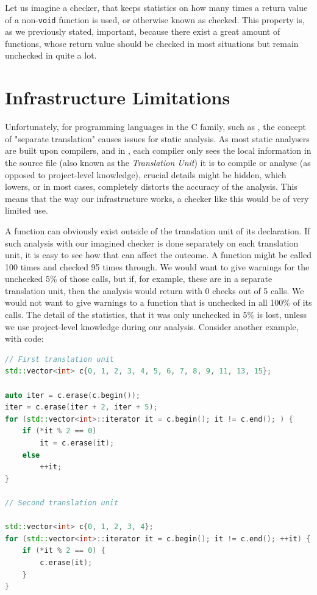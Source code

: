 Let us imagine a checker, that keeps statistics on how many times a return value of a non-\lstinline{void} function is used, or otherwise known
as checked. This property is, as we previously stated, important, because there exist a great amount of functions,
whose return value should be checked in most situations but remain unchecked in quite a lot.

\section{Infrastructure Limitations}

Unfortunately, for programming languages in the C family, such as \CC{}, the concept of "separate translation" causes issues for static
analysis. As most static analysers are built upon compilers, and in \CC{}, each compiler only sees the local information in the source file
(also known as the \emph{Translation Unit}) it is to compile or analyse (as opposed to project-level knowledge), crucial details
might be hidden, which lowers, or in most cases, completely distorts the accuracy of the analysis.
This means that the way our infrastructure works, a checker like this would be of very limited use.

A function can obviously exist outside of the translation unit of its declaration. If such analysis with our imagined checker is done
separately on each translation unit, it is easy to see how that can affect the outcome. A function might be called 100 times and 
checked 95 times through. We would want to give warnings for the unchecked 5\% of those calls, but if, for example, these are in a 
separate translation unit, then the analysis would return with 0 checks out of 5 calls. We would not want to give warnings to a
function that is unchecked in all 100\% of its calls. The detail of the statistics, that it was only unchecked in 5\% is lost,
unless we use project-level knowledge during our analysis. Consider another example, with code:


\begin{lstlisting}[language={C++},caption={An example of the infrastructure's limitations.},label={lst:motivation-example}]
// First translation unit
std::vector<int> c{0, 1, 2, 3, 4, 5, 6, 7, 8, 9, 11, 13, 15};

auto iter = c.erase(c.begin());
iter = c.erase(iter + 2, iter + 5);
for (std::vector<int>::iterator it = c.begin(); it != c.end(); ) {
    if (*it % 2 == 0)
        it = c.erase(it);
    else
        ++it;
}

// Second translation unit

std::vector<int> c{0, 1, 2, 3, 4};
for (std::vector<int>::iterator it = c.begin(); it != c.end(); ++it) {
    if (*it % 2 == 0) {
        c.erase(it);
    }
}
\end{lstlisting}

